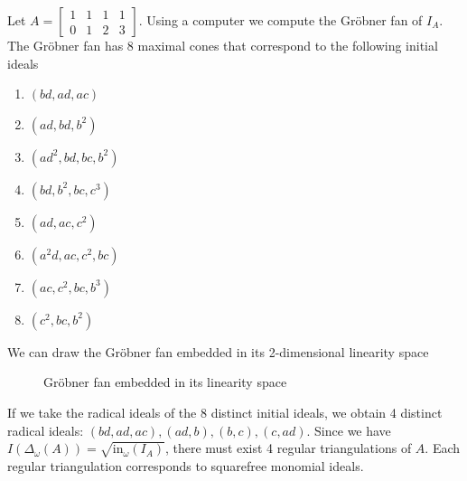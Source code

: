 \documentclass[a4paper, 11pt]{article}
\begin{document}
\begin{eg}
Let \( A = \begin{bmatrix}
  1 & 1 & 1 & 1 \\ 0 & 1 & 2 & 3
\end{bmatrix} \). Using a computer we compute the Gröbner fan of \( I_A \). The Gröbner fan has 8 maximal cones that correspond to the following initial ideals 
\begin{enumerate}
  \item \( (bd,ad,ac) \)
  \item \( (ad,bd,b^2) \)
  \item \( (ad^2,bd,bc,b^2) \)
  \item \( (bd,b^2,bc,c^3) \)
  \item \( (ad,ac,c^2) \)
  \item \( (a^2d,ac,c^2,bc) \)
  \item \( (ac,c^2,bc,b^3) \)
  \item \( (c^2,bc,b^2) \)
\end{enumerate}
We can draw the Gröbner fan embedded in its 2-dimensional linearity space 
\begin{figure}[H]
  \centering
  \caption{Gröbner fan embedded in its linearity space}
\end{figure}
If we take the radical ideals of the 8 distinct initial ideals, we obtain 4 distinct radical ideals: \( (bd, ad, ac), (ad,b), (b,c), (c,ad) \). Since we have \(  I(\Delta_\omega(A)) = \sqrt{\mathrm{in}_\omega(I_A)}\), there must exist 4 regular triangulations of \( A \). Each regular triangulation corresponds to squarefree monomial ideals.
\begin{figure}[H]

\end{figure}
\end{eg}
\end{document}
